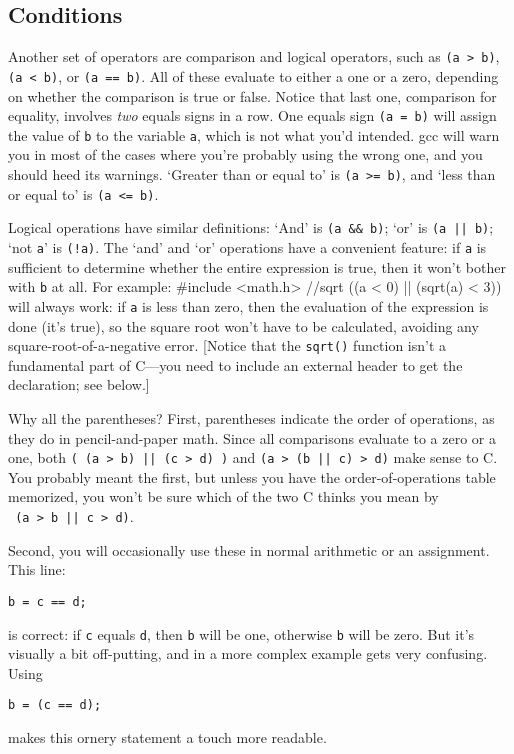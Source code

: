 \documentclass[12pt]{article}
\makeatletter
\def\ttindex#1{\index{#1@{\tt #1}}}
\makeatother
\begin{document}
\subsection{Conditions} 	
\label{forloops}    
\ttindex{<} \ttindex{>} \ttindex{==}
Another set of operators are comparison and logical operators, such as {\tt (a > b)},
{\tt (a < b)}, or {\tt (a == b)}. All of these evaluate to either a one or a zero, depending on whether the
comparison is true or false. Notice that last one, comparison for equality, involves {\sl two} equals
signs in a row. One equals sign {\tt (a = b)} will assign the value of {\tt b} to the variable {\tt a}, which is not what
you'd intended. gcc will warn you in most of the cases where you're
probably using the wrong one, and you should heed its warnings. `Greater than or equal to' is {\tt (a >=
b)}, and `less than or equal to' is {\tt (a <= b)}.

Logical operations have similar definitions: \ttindex{\&\&} \ttindex{"|"|} 
  
`And' is {\tt (a \&\& b)}; `or' is {\tt (a || b)}; `not {\tt a}' is {\tt (!a)}.
The `and' and `or' operations have a convenient feature: if {\tt a} is sufficient to determine whether
the entire expression is true, then it won't bother with {\tt b} at all. For example:
#include <math.h>    //sqrt
((a < 0) || (sqrt(a) < 3))
will always work: if {\tt a} is less than zero, then the evaluation of the expression is done (it's true),
so the square root won't have to be calculated, avoiding any
square-root-of-a-negative error. [Notice that the {\tt sqrt()} function
isn't a fundamental part of C---you need to include an external header to get the declaration; see below.]

Why all the parentheses? First, parentheses indicate the order of operations, as they do in pencil-and-paper
math. Since all comparisons evaluate to a zero or a one, both {\tt ( (a > b) || (c > d) )} and 
{\tt (a > (b || c) > d)} make sense to C. You probably meant the first, but unless you have
the order-of-operations table memorized, you won't be sure which of the two C thinks you mean by\\ {\tt
(a > b || c > d)}.

Second, you will occasionally use these in normal arithmetic or an assignment. This line:
\begin{verbatim}
b = c == d;
\end{verbatim}
is correct: if {\tt c} equals {\tt d}, then {\tt b} will be one, otherwise {\tt b} will be zero. But
it's visually a bit off-putting, and in a more complex example gets very confusing. Using
\begin{verbatim}
b = (c == d);
\end{verbatim}
makes this ornery statement a touch more readable.
\end{document}
